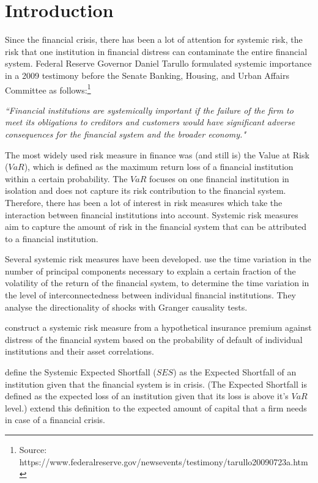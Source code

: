 \documentclass[12pt]{article}
\begin{document}
\newpage
{} %





\section{Introduction}


Since the financial crisis, there has been a lot of attention for systemic risk, the risk that one institution in financial distress can contaminate the entire financial system. Federal Reserve Governor Daniel Tarullo formulated systemic importance in a 2009 testimony before the Senate Banking, Housing, and Urban Affairs Committee as follows:\footnote{Source: https://www.federalreserve.gov/newsevents/testimony/tarullo20090723a.htm}

\textit{``Financial institutions are systemically important if the failure of the firm to meet its obligations to creditors and customers would have significant adverse consequences for the financial system and the broader economy."}

The most widely used risk measure in finance was (and still is) the Value at Risk ($VaR$), which is defined as the maximum return loss of a financial institution within a certain probability. The $VaR$ focuses on one financial institution in isolation and does not capture its risk contribution to the financial system. Therefore, there has been a lot of interest in risk measures which take the interaction between financial institutions into account. Systemic risk measures aim to capture the amount of risk in the financial system that can be attributed to a financial institution.

Several systemic risk measures have been developed. \citet{billio} use the time variation in the number of principal components necessary to explain a certain fraction of the volatility of the return of the financial system, to determine the time variation in the level of interconnectedness between individual financial institutions. They analyse the directionality of shocks with Granger causality tests.

\citet{huang} construct a systemic risk measure from a hypothetical insurance premium against distress of the financial system based on the probability of default of individual institutions and their asset correlations.

\citet{acharya1} define the Systemic Expected Shortfall ($SES$) as the Expected Shortfall of an institution given that the financial system is in crisis. (The Expected Shortfall is defined as the expected loss of an institution given that its loss is above it's $VaR$ level.)  \citet{acharya2} extend this definition to the expected amount of capital that a firm needs in case of a financial crisis.
\end{document}
